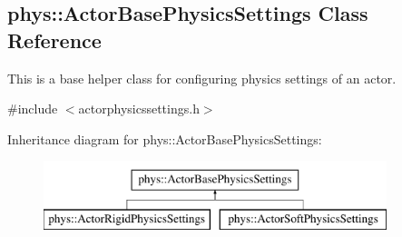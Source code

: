 \hypertarget{classphys_1_1ActorBasePhysicsSettings}{
\subsection{phys::ActorBasePhysicsSettings Class Reference}
\label{d2/d61/classphys_1_1ActorBasePhysicsSettings}
}


This is a base helper class for configuring physics settings of an actor.  




{\ttfamily \#include $<$actorphysicssettings.h$>$}

Inheritance diagram for phys::ActorBasePhysicsSettings:\begin{figure}[H]
\begin{center}
\leavevmode
\includegraphics[height=2.000000cm]{d2/d61/classphys_1_1ActorBasePhysicsSettings}
\end{center}
\end{figure}
